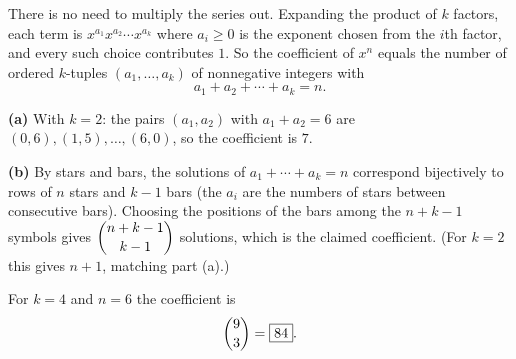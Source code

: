 There is no need to multiply the series out. Expanding the product of $k$ factors, each term is $x^{a_1}x^{a_2}\cdots x^{a_k}$ where $a_i\ge0$ is the exponent chosen from the $i$th factor, and every such choice contributes $1$. So the coefficient of $x^n$ equals the number of ordered $k$-tuples $(a_1,\dots,a_k)$ of nonnegative integers with
\[
a_1+a_2+\cdots+a_k=n.
\]

\textbf{(a)} With $k=2$: the pairs $(a_1,a_2)$ with $a_1+a_2=6$ are $(0,6),(1,5),\dots,(6,0)$, so the coefficient is $\boxed{7}$.

\textbf{(b)} By stars and bars, the solutions of $a_1+\cdots+a_k=n$ correspond bijectively to rows of $n$ stars and $k-1$ bars (the $a_i$ are the numbers of stars between consecutive bars). Choosing the positions of the bars among the $n+k-1$ symbols gives $\dbinom{n+k-1}{k-1}$ solutions, which is the claimed coefficient. (For $k=2$ this gives $n+1$, matching part (a).)

For $k=4$ and $n=6$ the coefficient is
\[
\dbinom{9}{3}=\boxed{84}.
\]
